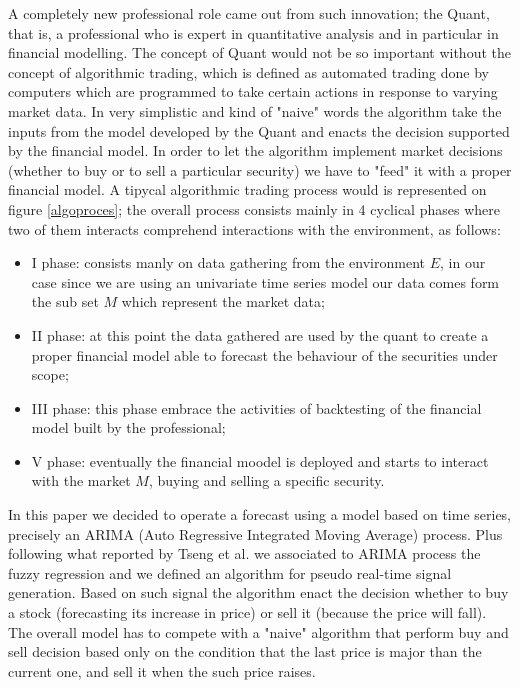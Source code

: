 \documentclass[twocolumn]{article}
\begin{document}
A completely new professional role came out from such innovation; the Quant, that is, a professional who is expert in quantitative analysis and in particular in financial modelling. The concept of Quant would not be so important without the concept of algorithmic trading, which is defined as automated trading done by computers which are programmed to take certain actions in response to varying market data. In very simplistic and kind of "naive" words the algorithm take the inputs from the model developed by the Quant and enacts the decision supported by the financial model.
In order to let the algorithm implement market decisions (whether to buy or to sell a particular security) we have to "feed" it with a proper financial model. A tipycal algorithmic trading process would is represented on figure \ref{algoproces}; the overall process consists mainly in 4 cyclical phases where two of them interacts comprehend interactions with the environment, as follows:

\begin{itemize}
\item I phase: consists manly on data gathering from the environment $E$, in our case since we are using an univariate time series model our data comes form the sub set $M$ which represent the market data;
\item II phase: at this point the data gathered are used by the quant to create a proper financial model able to forecast the behaviour of the securities under scope; 
\item III phase: this phase embrace the activities of backtesting of the financial model built by the professional;
\item V phase: eventually the financial moodel is deployed and starts to interact with the market $M$, buying and selling a specific security.
\end{itemize}

In this paper we decided to operate a forecast using a model based on time series, precisely an ARIMA (Auto Regressive Integrated Moving Average) process. Plus following what reported by Tseng et al.\cite{TsengFuzzyARIMAmodel2001} we associated to ARIMA process the fuzzy regression %
and we defined an algorithm for pseudo real-time signal generation. Based on such signal the algorithm enact the decision whether to buy a stock (forecasting its increase in price) or sell it (because the price will fall). The overall model has to compete with a "naive" algorithm that perform buy and sell decision based only on the condition that the last price is major than the current one, and sell it when the such price raises.
\end{document}
